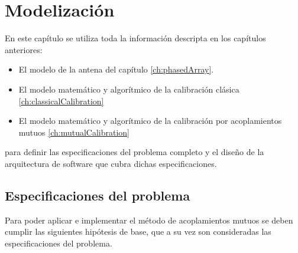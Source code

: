 \chapter{Modelización}
\label{ch:modelizacion}

En este capítulo se utiliza toda la información descripta en los capítulos anteriores:
\begin{itemize}
	\item El modelo de la antena del capítulo \ref{ch:phasedArray}.
	\item El modelo matemático y algorítmico de la calibración clásica \ref{ch:classicalCalibration}
	\item El modelo matemático y algorítmico de la calibración por acoplamientos mutuos \ref{ch:mutualCalibration}
\end{itemize}
para definir las especificaciones del problema completo y el diseño de la arquitectura de software que cubra dichas especificaciones. 


\section{Especificaciones del problema} \label{sc:specifications}

Para poder aplicar e implementar el método de acoplamientos mutuos se deben cumplir las siguientes hipótesis de base, que a su
vez son consideradas las especificaciones del problema.

